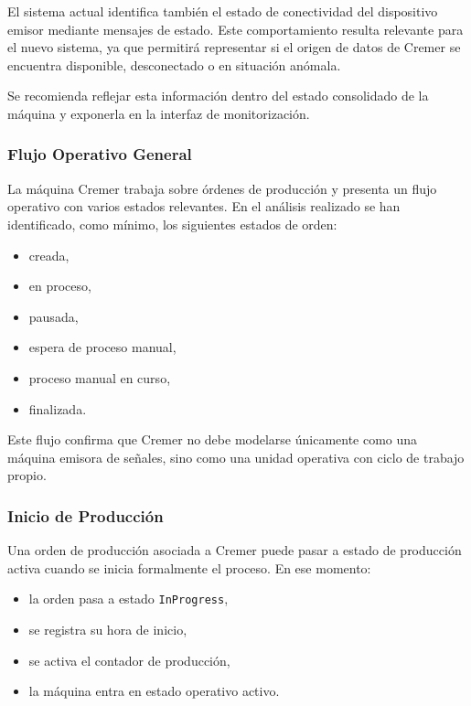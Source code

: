 El sistema actual identifica también el estado de conectividad del dispositivo emisor mediante mensajes de estado. Este comportamiento resulta relevante para el nuevo sistema, ya que permitirá representar si el origen de datos de Cremer se encuentra disponible, desconectado o en situación anómala.

Se recomienda reflejar esta información dentro del estado consolidado de la máquina y exponerla en la interfaz de monitorización.

\subsubsection{Flujo Operativo General}

La máquina Cremer trabaja sobre órdenes de producción y presenta un flujo operativo con varios estados relevantes. En el análisis realizado se han identificado, como mínimo, los siguientes estados de orden:

\begin{itemize}
    \item creada,
    \item en proceso,
    \item pausada,
    \item espera de proceso manual,
    \item proceso manual en curso,
    \item finalizada.
\end{itemize}

Este flujo confirma que Cremer no debe modelarse únicamente como una máquina emisora de señales, sino como una unidad operativa con ciclo de trabajo propio.

\subsubsection{Inicio de Producción}

Una orden de producción asociada a Cremer puede pasar a estado de producción activa cuando se inicia formalmente el proceso. En ese momento:

\begin{itemize}
    \item la orden pasa a estado \texttt{InProgress},
    \item se registra su hora de inicio,
    \item se activa el contador de producción,
    \item la máquina entra en estado operativo activo.
\end{itemize}

